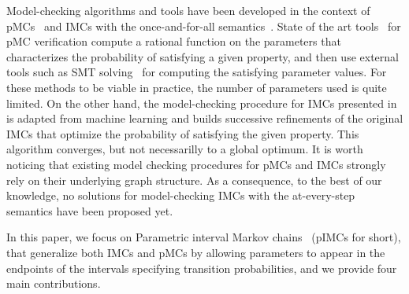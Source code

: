 \documentclass{llncs}
\newcommand{\imc}{\textnormal{IMC}}
\newcommand{\pimc}{\textnormal{pIMC}}
\newcommand{\pmc}{\textnormal{pMC}}
\begin{document}
Model-checking algorithms and tools have been developed %
in the context of
{\pmc}s~\cite{Prophesy,DBLP:conf/cav/HahnHWZ10,DBLP:conf/cav/KwiatkowskaNP11}
and {\imc}s with the once-and-for-all
semantics~\cite{Chakraborty2015,benedikt2013ltl}. State of the art tools~\cite{Prophesy} for {\pmc}
verification compute a rational function on the parameters that
characterizes the probability of satisfying a given property, and then
use external tools such as SMT solving~\cite{Prophesy} for computing the
satisfying parameter values. For these methods to be viable in
practice, the number of parameters used is quite limited. On the other
hand, the model-checking procedure for {\imc}s presented
in~\cite{benedikt2013ltl} is adapted from machine learning and builds
successive refinements of the original {\imc}s that optimize the
probability of satisfying the given property. This algorithm
converges, but not necessarilly to a global optimum. It is worth noticing that
existing model checking procedures for {\pmc}s and {\imc}s
strongly rely on their underlying graph structure. As a consequence,
to the best of our knowledge, no solutions for model-checking {\imc}s
with the at-every-step semantics have been proposed yet.





In this paper, we focus on Parametric interval Markov
chains~\cite{DelahayeLP16} ({\pimc}s for short), that generalize both
{\imc}s and {\pmc}s by allowing parameters to appear in the endpoints
of the intervals specifying transition probabilities, and we provide four main contributions. 
\end{document}
